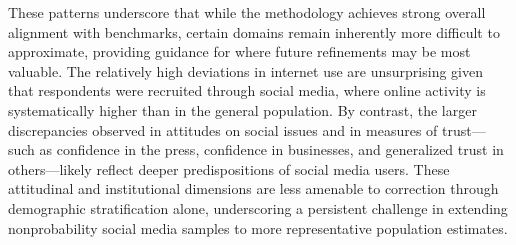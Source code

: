 \documentclass[letterpaper,12pt]{article}
\theoremstyle{proposition}
\begin{document}
These patterns underscore that while the methodology achieves strong overall alignment with benchmarks, certain domains remain inherently more difficult to approximate, providing guidance for where future refinements may be most valuable. The relatively high deviations in internet use are unsurprising given that respondents were recruited through social media, where online activity is systematically higher than in the general population. By contrast, the larger discrepancies observed in attitudes on social issues and in measures of trust—such as confidence in the press, confidence in businesses, and generalized trust in others—likely reflect deeper predispositions of social media users. These attitudinal and institutional dimensions are less amenable to correction through demographic stratification alone, underscoring a persistent challenge in extending nonprobability social media samples to more representative population estimates.






\end{document}
